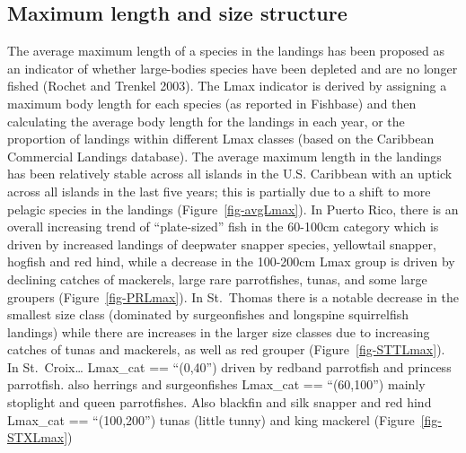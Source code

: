 \documentclass[
  letterpaper,
  oneside,
  open=any]{scrbook}
\begin{document}
\subsection{Maximum length and size
structure}\label{maximum-length-and-size-structure}

The average maximum length of a species in the landings has been
proposed as an indicator of whether large-bodies species have been
depleted and are no longer fished (Rochet and Trenkel 2003). The Lmax
indicator is derived by assigning a maximum body length for each species
(as reported in Fishbase) and then calculating the average body length
for the landings in each year, or the proportion of landings within
different Lmax classes (based on the Caribbean Commercial Landings
database). The average maximum length in the landings has been
relatively stable across all islands in the U.S. Caribbean with an
uptick across all islands in the last five years; this is partially due
to a shift to more pelagic species in the landings
(Figure~\ref{fig-avgLmax}). In Puerto Rico, there is an overall
increasing trend of ``plate-sized'' fish in the 60-100cm category which
is driven by increased landings of deepwater snapper species, yellowtail
snapper, hogfish and red hind, while a decrease in the 100-200cm Lmax
group is driven by declining catches of mackerels, large rare
parrotfishes, tunas, and some large groupers (Figure~\ref{fig-PRLmax}).
In St.~Thomas there is a notable decrease in the smallest size class
(dominated by surgeonfishes and longspine squirrelfish landings) while
there are increases in the larger size classes due to increasing catches
of tunas and mackerels, as well as red grouper
(Figure~\ref{fig-STTLmax}). In St.~Croix\ldots{} Lmax\_cat == ``(0,40'')
driven by redband parrotfish and princess parrotfish. also herrings and
surgeonfishes Lmax\_cat == ``(60,100'') mainly stoplight and queen
parrotfishes. Also blackfin and silk snapper and red hind Lmax\_cat ==
``(100,200'') tunas (little tunny) and king mackerel
(Figure~\ref{fig-STXLmax})
\end{document}
